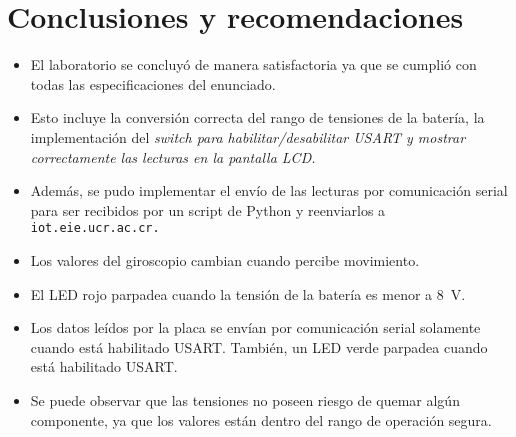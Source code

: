 \section{Conclusiones y recomendaciones}
\begin{itemize}
    \item El laboratorio se concluyó de manera satisfactoria ya que se cumplió con todas las especificaciones del enunciado.
    \item Esto incluye la conversión correcta del rango de tensiones de la batería, la implementación del \it{switch} para habilitar/desabilitar USART y mostrar correctamente las lecturas en la pantalla LCD.
    \item Además, se pudo implementar el envío de las lecturas por comunicación serial para ser recibidos por un script de Python y reenviarlos a \tt{iot.eie.ucr.ac.cr}.
    \item Los valores del giroscopio cambian cuando percibe movimiento.
    \item El LED rojo parpadea cuando la tensión de la batería es menor a \SI{8}{\volt}.
    \item Los datos leídos por la placa se envían por comunicación serial solamente cuando está habilitado USART.
    También, un LED verde parpadea cuando está habilitado USART.
    \item Se puede observar que las tensiones no poseen riesgo de quemar algún componente, ya que los valores están dentro del rango de operación segura.
\end{itemize}



 





